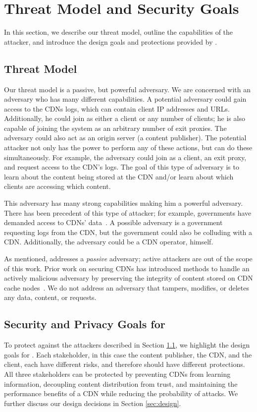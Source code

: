 \section{Threat Model and Security Goals}
\label{sec:threat}
In this section, we describe our threat model, outline the capabilities of the 
attacker, and introduce the design goals and protections provided by \system{}.

\subsection{Threat Model}
\label{sec:attacker}

Our threat model is a passive, but powerful adversary.  We are concerned with an 
adversary who has many different capabilities.  A potential adversary could gain 
access to the CDNs logs, which can contain client IP addresses and URLs.  Additionally, 
he could join \system{} as either a client or any number of clients; he is also capable 
of joining the system as an arbitrary number of exit proxies.  The adversary could 
also act as an origin server (a content publisher).  The potential attacker not only has the 
power to perform any of these actions, but can do these simultaneously.  For example, the 
adversary could join as a client, an exit proxy, and request access to the CDN's logs.  The 
goal of this type of adversary is to learn about the content being stored at the CDN and/or 
learn about which clients are accessing which content.  

This adversary has many strong capabilities making him a powerful adversary.  There has been 
precedent of this type of attacker; for example, governments have demanded access to CDNs' 
data~\cite{cloudflare_nsl}.  A possible adversary is a government requesting logs from the CDN, but 
the government could also be colluding with a CDN.  Additionally, the adversary could be a CDN operator, 
himself.  

As mentioned, \system{} addresses a {\it passive} adversary; active attackers are out of the 
scope of this work.  Prior work on securing CDNs has introduced methods to handle an actively 
malicious adversary by preserving the integrity of content stored on CDN cache nodes~\cite{levy2015stickler}.  
We do not address an adversary that tampers, modifies, or deletes any data, content, or requests.  

\subsection{Security and Privacy Goals for \system{}}
\label{sec:goals}
To protect against the attackers described in Section 
\ref{sec:attacker}, we highlight the design goals for \system{}. 
Each stakeholder, in this case the content publisher, the CDN, and the client, each have 
different risks, and therefore should have different protections.  All three stakeholders 
can be protected by preventing CDNs from learning information, decoupling content distribution from trust, and 
maintaining the performance benefits of a CDN while reducing the probability of attacks.  
We further discuss our design decisions in Section \ref{sec:design}.

